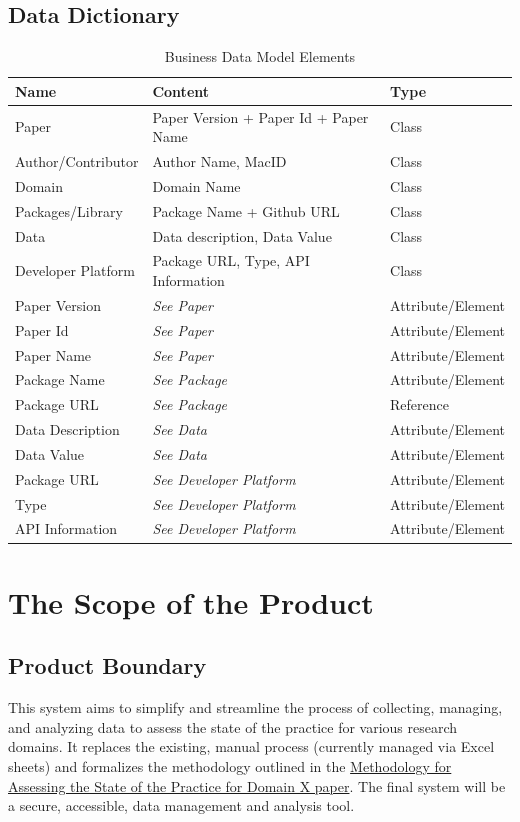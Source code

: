 \documentclass[12pt]{article}
\begin{document}
\subsection{Data Dictionary}
\begin{table}[H]
\centering
\begin{tabularx}{\textwidth}{|l|X|l|}
\hline
\textbf{Name} & \textbf{Content} & \textbf{Type} \\ \hline
Paper & Paper Version + Paper Id + Paper Name & Class \\ \hline
Author/Contributor & Author Name, MacID & Class \\ \hline
Domain & Domain Name & Class \\ \hline
Packages/Library & Package Name + Github URL & Class \\ \hline
Data & Data description, Data Value & Class \\ \hline
Developer Platform & Package URL, Type, API Information & Class \\ \hline
Paper Version & \textit{See Paper} & Attribute/Element \\ \hline
Paper Id & \textit{See Paper} & Attribute/Element \\ \hline
Paper Name & \textit{See Paper} & Attribute/Element \\ \hline
Package Name & \textit{See Package} & Attribute/Element \\ \hline
Package URL & \textit{See Package} & Reference \\ \hline
Data Description & \textit{See Data} & Attribute/Element \\ \hline
Data Value & \textit{See Data} & Attribute/Element \\ \hline
Package URL & \textit{See Developer Platform} & Attribute/Element \\ \hline
Type & \textit{See Developer Platform} & Attribute/Element \\ \hline
API Information & \textit{See Developer Platform} & Attribute/Element \\ \hline
\end{tabularx}
\caption{Business Data Model Elements}
\end{table}


\section{The Scope of the Product}
\subsection{Product Boundary}
This system aims to simplify and streamline the process of collecting, managing, and analyzing data to assess the state of the practice for various research domains. It replaces the existing, manual process (currently managed via Excel sheets) and formalizes the methodology outlined in the \href{https://arxiv.org/abs/2110.11575}{Methodology for Assessing the State of the Practice for Domain X paper}. The final system will be a secure, accessible, data management and analysis tool.
\end{document}
